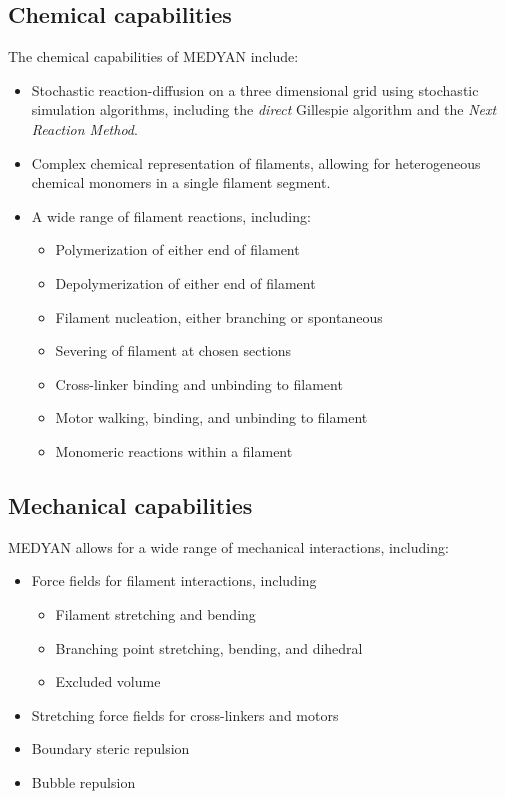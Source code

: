 \documentclass[11pt, oneside]{article}   	%
\begin{document}
\subsection{Chemical capabilities}
 The chemical capabilities of MEDYAN include:

\begin{itemize}

\item Stochastic reaction-diffusion on a three dimensional grid using stochastic simulation algorithms, including the \textit{direct} Gillespie algorithm and the \textit{Next Reaction Method}.
\item Complex chemical representation of filaments, allowing for heterogeneous chemical monomers in a single filament segment.
\item A wide range of filament reactions, including:
\begin{itemize}
\item Polymerization of either end of filament
\item Depolymerization of either end of filament
\item Filament nucleation, either branching or spontaneous
\item Severing of filament at chosen sections
\item Cross-linker binding and unbinding to filament
\item Motor walking, binding, and unbinding to filament
\item Monomeric reactions within a filament

\end{itemize}
\end{itemize}

\subsection{Mechanical capabilities}
MEDYAN allows for a wide range of mechanical interactions, including:

\begin{itemize}
\item Force fields for filament interactions, including
\begin{itemize}
\item Filament stretching and bending 
\item Branching point stretching, bending, and dihedral
\item Excluded volume 
\end{itemize}
\item Stretching force fields for cross-linkers and motors 
\item Boundary steric repulsion
\item Bubble repulsion
\end{itemize}
\end{document}
